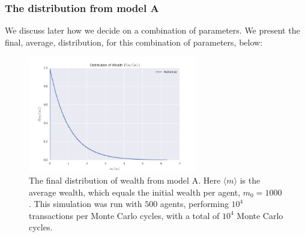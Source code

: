 \documentclass[a4paper, 10pt]{article}
\begin{document}
\subsubsection{The distribution from model A}
We discuss later how we decide on a combination of parameters. We present the final, average, distribution, for this combination of parameters, below:\\
\linebreak
\begin{figure}[!hb]
\centering
\includegraphics[height=2.0in]{distLamb0.png}
\caption{The final distribution of wealth from model A. Here $\langle m \rangle$ is the average wealth, which equals the initial wealth per agent, $m_0=1000$. This simulation was run with $500$ agents, performing $10^4$ transactions per Monte Carlo cycles, with a total of $10^4$ Monte Carlo cycles.}\label{fig:ModelA_final_distribution}
\end{figure}
\newpage
\end{document}
